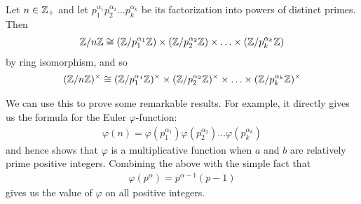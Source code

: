 \documentclass{memoir}
\begin{document}
\begin{cor}
	Let \(n \in \mathbb{Z}_+\) and let \(p_1^{\alpha_1}p_2^{\alpha_2}\ldots p_k^{\alpha_k}\) be its factorization into powers of distinct primes. Then
	\begin{align*}
		\mathbb{Z} / n\mathbb{Z} \cong (\mathbb{Z} / p_1^{\alpha_1}\mathbb{Z}) \times (\mathbb{Z} / p_2^{\alpha_2}\mathbb{Z}) \times \ldots\times (\mathbb{Z} / p_k^{\alpha_k}\mathbb{Z})
	\end{align*}
	by ring isomorphism, and so
	\begin{align*}
		(\mathbb{Z} / n\mathbb{Z})^{\times }\cong (\mathbb{Z} / p_1^{\alpha_1}\mathbb{Z})^{\times } \times (\mathbb{Z} / p_2^{\alpha_2}\mathbb{Z})^{\times } \times \ldots\times (\mathbb{Z} / p_k^{\alpha_k}\mathbb{Z})^{\times }
	\end{align*}
\end{cor}
We can use this to prove some remarkable results. For example, it directly gives us the formula for the Euler \(\varphi \)-function:
\begin{align*}
	\varphi (n) = \varphi (p_1^{\alpha_1})\varphi(p_2^{\alpha _2})\ldots\varphi (p_k^{\alpha _k})
\end{align*}
and hence shows that \(\varphi \) is a multiplicative function when \(a\) and \(b\) are relatively prime positive integers. Combining the above with the simple fact that
\begin{align*}
	\varphi (p^{\alpha }) = p^{\alpha -1}(p-1)
\end{align*}
gives us the value of \(\varphi \) on all positive integers.

\end{document}
